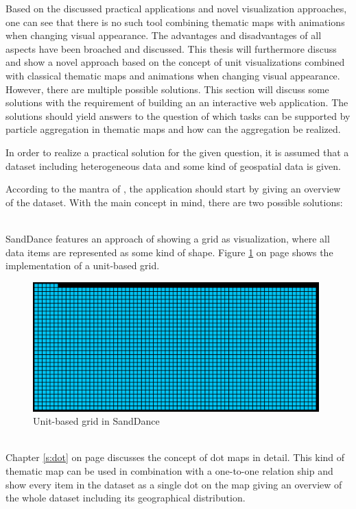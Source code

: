 Based on the discussed practical applications and novel visualization approaches, one can see that there is no such tool combining thematic maps with animations when changing visual appearance. The advantages and disadvantages of all aspects have been broached and discussed. This thesis will furthermore discuss and show a novel approach based on the concept of unit visualizations combined with classical thematic maps and animations when changing visual appearance. However, there are multiple possible solutions. This section will discuss some solutions with the requirement of building an an interactive web application. The solutions should yield answers to the question of which tasks can be supported by particle aggregation in thematic maps and how can the aggregation be realized.

In order to realize a practical solution for the given question, it is assumed that a dataset including heterogeneous data and some kind of geospatial data is given.

According to the mantra of \citeauthor{Shneiderman1996}, the application should start by giving an overview of the dataset. With the main concept in mind, there are two possible solutions:
\begin{enumerate}

 \hfill \\
SandDance features an approach of showing a grid as visualization, where all data items are represented as some kind of shape. Figure \ref{fig:sanddance-grid} on page \pageref{fig:sanddance-grid} shows the implementation of a unit-based grid.

\begin{figure}[!htb]
\centering
\includegraphics[height=5cm]{images/methods/related/sanddance-grid.png}
\caption[
    Unit-based grid in SandDance.
]{Unit-based grid in SandDance}
\label{fig:sanddance-grid}
\end{figure}

 \hfill \\
Chapter \ref{s:dot} on page \pageref{s:dot} discusses the concept of dot maps in detail. This kind of thematic map can be used in combination with a one-to-one relation ship and show every item in the dataset as a single dot on the map giving an overview of the whole dataset including its geographical distribution.
\end{enumerate}

